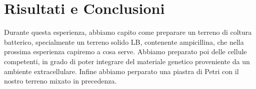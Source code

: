 \section{Risultati e Conclusioni}

Durante questa esperienza, abbiamo capito come preparare un terreno di coltura batterico,
specialmente un terreno solido LB, contenente ampicillina,
che nella prossima esperienza capiremo a cosa serve.
Abbiamo preparato poi delle cellule competenti,
in grado di poter integrare del materiale genetico proveniente da un ambiente extracellulare.
Infine abbiamo perparato una piastra di Petri con il nostro terreno mixato in precedenza.
